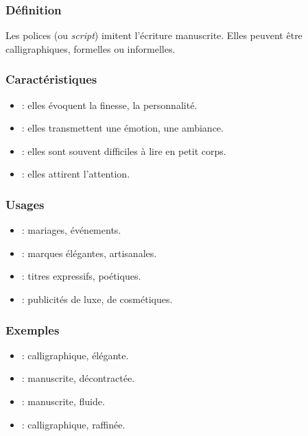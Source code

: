 \subsubsection{Définition}

Les polices  (ou \emph{script}) imitent l'écriture manuscrite. Elles peuvent être calligraphiques, formelles ou informelles.

\subsubsection{Caractéristiques}

\begin{itemize}
    \item {} : elles évoquent la finesse, la personnalité.
    \item {} : elles transmettent une émotion, une ambiance.
    \item {} : elles sont souvent difficiles à lire en petit corps.
    \item {} : elles attirent l'attention.
\end{itemize}

\subsubsection{Usages}

\begin{itemize}
    \item {} : mariages, événements.
    \item {} : marques élégantes, artisanales.
    \item {} : titres expressifs, poétiques.
    \item {} : publicités de luxe, de cosmétiques.
\end{itemize}

\subsubsection{Exemples}

\begin{itemize}
    \item {} : calligraphique, élégante.
    \item {} : manuscrite, décontractée.
    \item {} : manuscrite, fluide.
    \item {} : calligraphique, raffinée.
\end{itemize}

